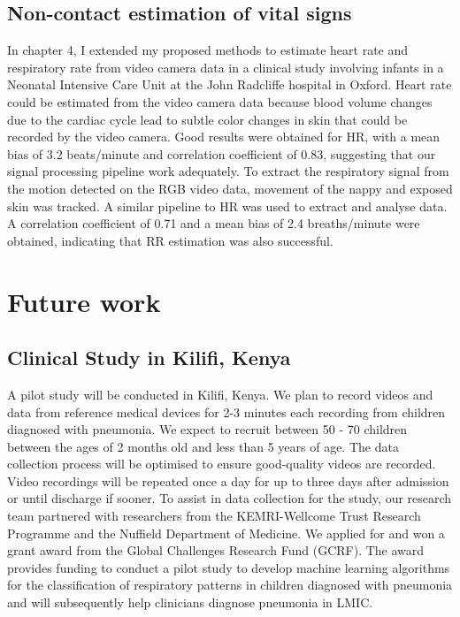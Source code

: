 \subsection{Non-contact estimation of vital signs}
In chapter 4, I extended my proposed methods to estimate heart rate and respiratory rate from video camera data in a clinical study involving infants in a Neonatal Intensive Care Unit at the John Radcliffe hospital in Oxford. Heart rate could be estimated from the video camera data because blood volume changes due to the cardiac cycle lead to subtle color changes in skin that could be recorded by the video camera. Good results were obtained for HR, with a mean bias of 3.2 beats/minute and correlation coefficient of 0.83, suggesting that our signal processing pipeline work adequately. To extract the respiratory signal from the motion detected on the RGB video data, movement of the nappy and exposed skin was tracked. A similar pipeline to HR was used to extract and analyse data. A correlation coefficient of 0.71 and a mean bias of 2.4 breaths/minute were obtained, indicating that RR estimation was also successful.

\section{Future work}
\subsection{Clinical Study in Kilifi, Kenya}
A pilot study will be conducted in Kilifi, Kenya. We plan to record videos and data from reference medical devices for 2-3 minutes each recording from children diagnosed with pneumonia. We expect to recruit between 50 - 70 children between the ages of 2 months old and less than 5 years of age. The data collection process will be optimised to ensure good-quality videos are recorded. Video recordings will be repeated once a day for up to three days after admission or until discharge if sooner. To assist in data collection for the study, our research team partnered with researchers from the KEMRI-Wellcome Trust Research Programme and the Nuffield Department of Medicine. We applied for and won a grant award from the Global Challenges Research Fund (GCRF). The award provides funding to conduct a pilot study to develop machine learning algorithms for the classification of respiratory patterns in children diagnosed with pneumonia and will subsequently help clinicians diagnose pneumonia in LMIC.

